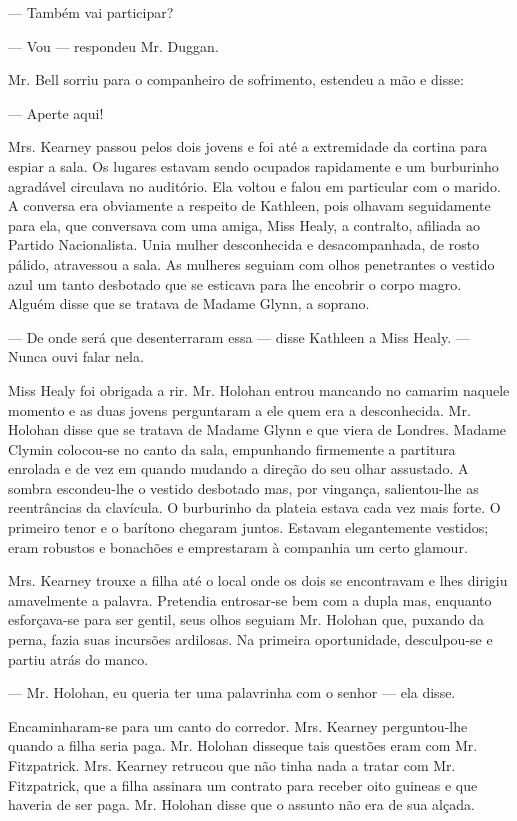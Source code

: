 --- Também vai participar?

--- Vou --- respondeu Mr. Duggan.

Mr. Bell sorriu para o companheiro de sofrimento, estendeu a mão e
disse:

--- Aperte aqui!

Mrs. Kearney passou pelos dois jovens e foi até a extremidade da
cortina para espiar a sala. Os lugares estavam sendo ocupados
rapidamente e um burburinho agradável circulava no auditório. Ela
voltou e falou em particular com o marido. A conversa era obviamente a
respeito de Kathleen, pois olhavam seguidamente para ela, que
conversava com uma amiga, Miss Healy, a contralto,
afiliada ao Partido Nacionalista. Unia mulher desconhecida e
desacompanhada, de rosto pálido, atravessou a sala. As mulheres
seguiam com olhos penetrantes o vestido azul um tanto desbotado que
se esticava para lhe encobrir o corpo magro. Alguém disse que se
tratava de Madame Glynn, a soprano.

--- De onde será que desenterraram essa --- disse Kathleen a Miss
Healy. --- Nunca ouvi falar nela.

Miss Healy foi obrigada a rir. Mr. Holohan entrou mancando no camarim
naquele momento e as duas jovens perguntaram a ele quem era a
desconhecida. Mr. Holohan disse que se tratava de Madame Glynn e que
viera de Londres. Madame Clymin colocou-se no canto da sala,
empunhando firmemente a partitura enrolada e de vez em quando mudando
a direção do seu olhar assustado. A sombra escondeu-lhe o vestido
desbotado mas, por vingança, salientou-lhe as reentrâncias da
clavícula. O burburinho da plateia estava cada vez mais forte. O
primeiro tenor e o barítono chegaram juntos. Estavam elegantemente
vestidos; eram robustos e bonachões e emprestaram à companhia um
certo glamour.

Mrs. Kearney trouxe a filha até o local onde os dois se
encontravam e lhes dirigiu amavelmente a palavra. Pretendia
entrosar-se bem com a dupla mas, enquanto esforçava-se para ser
gentil, seus olhos seguiam Mr. Holohan que, puxando da perna, fazia
suas incursões ardilosas. Na primeira oportunidade, desculpou-se e
partiu atrás do manco.

--- Mr. Holohan, eu queria ter uma palavrinha com o senhor 
--- ela disse.

Encaminharam-se para um canto do corredor. Mrs. Kearney perguntou-lhe
quando a filha seria paga. Mr. Holohan disseque tais questões eram
com Mr. Fitzpatrick. Mrs. Kearney retrucou que não tinha nada a tratar
com Mr. Fitzpatrick, que a filha assinara um contrato para receber
oito guineas e que haveria de ser paga. Mr. Holohan disse que o
assunto não era de sua alçada.

